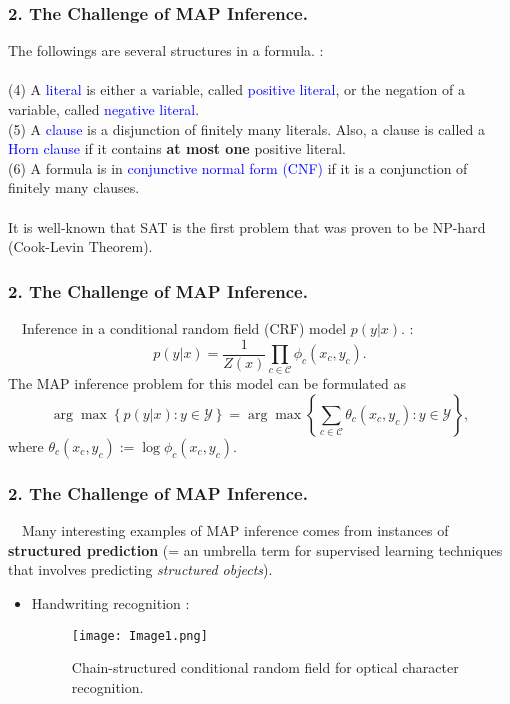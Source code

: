 \documentclass[11pt]{beamer}
\newtheorem*{pf of lemma}{\it Proof of the \normalfont \bf Lemma}
\newtheorem*{pf of claim}{\it Proof of the \normalfont \sf Claim}
\begin{document}
\begin{frame}
\frametitle{2. The Challenge of MAP Inference.}
The followings are several structures in a formula. : \\ \ \\
(4) A \textcolor{blue}{literal} is either a variable, called \textcolor{blue}{positive literal}, or the negation of a variable, called \textcolor{blue}{negative literal}. \\
(5) A \textcolor{blue}{clause} is a disjunction of finitely many literals. Also, a clause is called a \textcolor{blue}{Horn clause} if it contains \textbf{at most one} positive literal. \\
(6) A formula is in \textcolor{blue}{conjunctive normal form (CNF)} if it is a conjunction of finitely many clauses. \\ \ \\
It is well-known that SAT is the first problem that was proven to be NP-hard (Cook-Levin Theorem).

\end{frame}

\begin{frame}
\frametitle{2. The Challenge of MAP Inference.}

\begin{example}
\ \ \indent Inference in a conditional random field (CRF) model $p(y|x)$. : \\
$$p(y | x) = \frac{1}{Z(x)} \prod_{c \in \mathcal{C}} \phi_{c}(x_c, y_c).$$
The MAP inference problem for this model can be formulated as
$$\arg \max \left\{ p(y|x) : y \in \mathcal{Y} \right\} = \arg \max \left\{ \sum_{c \in \mathcal{C}} \theta_{c}(x_c, y_c) : y \in \mathcal{Y} \right\},$$
where $\theta_{c} (x_c, y_c) := \log \phi_{c}(x_c, y_c)$.
\end{example}

\end{frame}

\begin{frame}
\frametitle{2. The Challenge of MAP Inference.}

\ \ \indent Many interesting examples of MAP inference comes from instances of \textbf{structured prediction} (= an umbrella term for supervised learning techniques that involves predicting \textit{structured objects}). \\

\begin{itemize}
\item Handwriting recognition : 

\begin{figure}[h]
\begin{center}
\texttt{[image: Image1.png]}
\caption{Chain-structured conditional random field for optical character recognition.}
\end{center}
\end{figure}

\end{itemize}

\end{frame}
\end{document}
